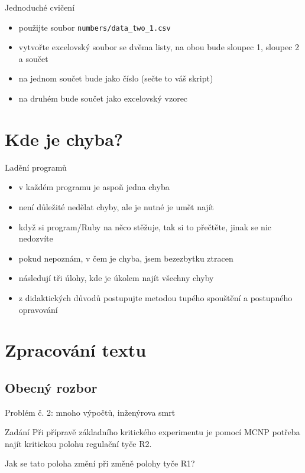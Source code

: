 \documentclass{beamer}
\begin{document}
\begin{frame}{Jednoduché cvičení}
  \begin{itemize}
    \item použijte soubor \texttt{numbers/data\_two\_1.csv}
    \item vytvořte excelovský soubor se dvěma listy, na obou bude sloupec 1, sloupec 2 a součet
    \item na jednom součet bude jako číslo (sečte to váš skript)
    \item na druhém bude součet jako excelovský vzorec
  \end{itemize}
\end{frame}


\section{Kde je chyba?}

\begin{frame}{Ladění programů}
  \begin{itemize}
    \item v každém programu je aspoň jedna chyba
    \item není důležité nedělat chyby, ale je nutné je umět najít
    \item když si program/Ruby na něco stěžuje, tak si to přečtěte, jinak se nic nedozvíte
    \item pokud nepoznám, v čem je chyba, jsem bezezbytku ztracen
    \item následují tři úlohy, kde je úkolem najít všechny chyby
    \item z didaktických důvodů postupujte metodou tupého spouštění a postupného opravování
  \end{itemize}
\end{frame}

\section{Zpracování textu}

\subsection{Obecný rozbor}

\begin{frame}{Problém č. 2: mnoho výpočtů, inženýrova smrt}
  \begin{block}{Zadání}
    Při přípravě základního kritického experimentu je pomocí MCNP potřeba najít kritickou polohu regulační tyče R2.

    Jak se tato poloha změní při změně polohy tyče R1?
  \end{block}
\end{frame}
\end{document}
